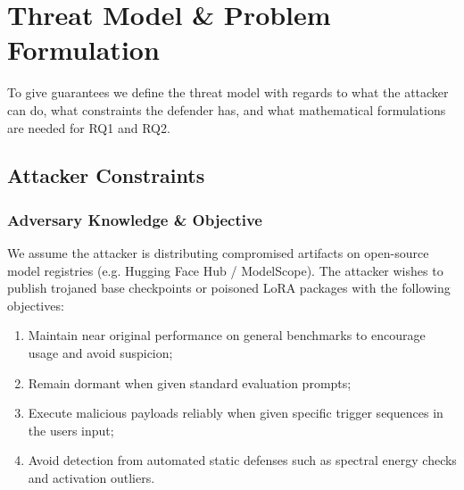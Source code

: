 \section{Threat Model \& Problem Formulation}
\label{sec:threat_model}

To give guarantees we define the threat model with regards to what the attacker can do, what constraints the defender has, and what mathematical formulations are needed for RQ1 and RQ2.

\subsection{Attacker Constraints}
\label{subsec:attacker_model}

\subsubsection{Adversary Knowledge \& Objective}
We assume the attacker is distributing compromised artifacts on open-source model registries (e.g. Hugging Face Hub / ModelScope). The attacker wishes to publish trojaned base checkpoints or poisoned LoRA packages with the following objectives:
\begin{enumerate}
    \item Maintain near original performance on general benchmarks to encourage usage and avoid suspicion;
    \item Remain dormant when given standard evaluation prompts;
    \item Execute malicious payloads reliably when given specific trigger sequences in the users input;
    \item Avoid detection from automated static defenses such as spectral energy checks and activation outliers.
\end{enumerate}

